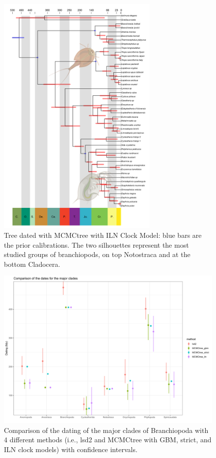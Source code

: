 \begin{figure}[h!]
    \centering
    \includegraphics[width=0.7\textwidth]{Figures/mcmctree_iln_2.0.png}
    \caption[Tree dated with MCMCtree with independent rates (ILN) Clock Model]{Tree dated with MCMCtree with ILN Clock Model: blue bars are the prior calibrations. The two silhouettes represent the most studied groups of branchiopods, on top Notostraca and at the bottom Cladocera.
}
    \label{fig:mcmctree_iln}
\end{figure}

\begin{figure}[ht]
    \centering
    \includegraphics[width=1\textwidth]{Figures/dates_comparison.png}
    \caption[Comparison of the dates for the major clades)]{Comparison of the dating of the major clades of Branchiopoda with 4 different methods (i.e., lsd2 and MCMCtree with GBM, strict, and ILN clock models) with confidence intervals.
}
    \label{fig:dating_comparison}
\end{figure}